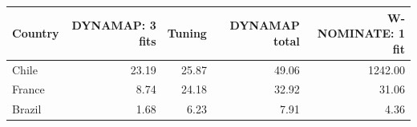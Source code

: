 \begin{tabular}{lrrrr}
\toprule
Country & DYNAMAP: 3 fits & Tuning & DYNAMAP total & W-NOMINATE: 1 fit \\
\midrule
Chile & 23.19 & 25.87 & 49.06 & 1242.00 \\
France & 8.74 & 24.18 & 32.92 & 31.06 \\
Brazil & 1.68 & 6.23 & 7.91 & 4.36 \\
\bottomrule
\end{tabular}
